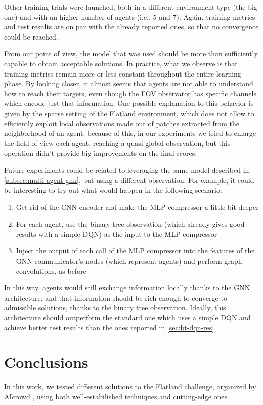 \documentclass[a4paper,10pt]{report}
\begin{document}
Other training trials were launched, both in a different environment type (the big one) and with an higher number of agents (i.e., $5$ and $7$). Again, training metrics and test results are on par with the already reported ones, so that no convergence could be reached.

From our point of view, the model that was used should be more than sufficiently capable to obtain acceptable solutions. In practice, what we observe is that training metrics remain more or less constant throughout the entire learning phase. By looking closer, it almost seems that agents are not able to understand how to reach their targets, even though the FOV observator has specific channels which encode just that information. One possible explanation to this behavior is given by the sparse setting of the Flatland environment, which does not allow to efficiently exploit local observations made out of patches extracted from the neighborhood of an agent: because of this, in our experiments we tried to enlarge the field of view each agent, reaching a quasi-global observation, but this operation didn't provide big improvements on the final scores.

Future experiments could be related to leveraging the same model described in \ref{subsec:multi-agent-gnn}, but using a different observation. For example, it could be interesting to try out what would happen in the following scenario:
\begin{enumerate}
	\item Get rid of the CNN encoder and make the MLP compressor a little bit deeper
	\item For each agent, use the binary tree observation (which already gives good results with a simple DQN) as the input to the MLP compressor
	\item Inject the output of each call of the MLP compressor into the features of the GNN communicator's nodes (which represent agents) and perform graph convolutions, as before
\end{enumerate}

In this way, agents would still exchange information locally thanks to the GNN architecture, and that information should be rich enough to converge to admissible solutions, thanks to the binary tree observation. Ideally, this architecture should outperform the standard one which uses a simple DQN and achieve better test results than the ones reported in \ref{sec:bt-dqn-res}.

\chapter{Conclusions}
In this work, we tested different solutions to the Flatland challenge, organized by AIcrowd \cite{aicrowd}, using both well-estabilished techniques and cutting-edge ones. 
\end{document}
